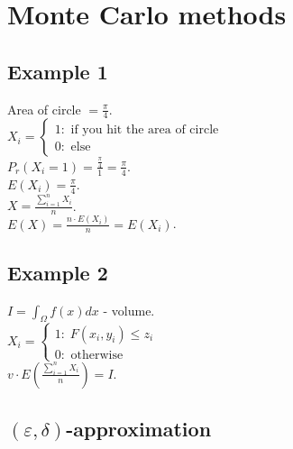 \documentclass[a4paper, 12pt]{book}
\theoremstyle{definition}
\theoremstyle{remark}
\begin{document}
\chapter{Monte Carlo methods}


\section{Example 1}

Area of circle $= \frac{\pi}{4}$. \\
$X_i = \begin{cases}
  1: \text{ if you hit the area of circle} \\
  0: \text{ else}
\end{cases}$ \\
$P_r(X_i = 1) = \frac{\frac{\pi}{4}}{1} = \frac{\pi}{4}$. \\
$E(X_i) = \frac{\pi}{4}$. \\
$X = \frac{\sum_{i=1}^{n} X_i}{n}$. \\
$E(X) = \frac{n \cdot E(X_i)}{n} = E(X_i)$.



\section{Example 2}

$I = \int_{\Omega} f(x) dx$ - volume. \\
$X_i = \begin{cases}
  1: \; F(x_i,y_i) \leq z_i \\
  0: \text{ otherwise}
\end{cases}$ \\
$v \cdot E\left(\frac{\sum_{i=1}^{n} X_i}{n}\right) = I$.


\section{$(\varepsilon,\delta)$-approximation}
\end{document}
